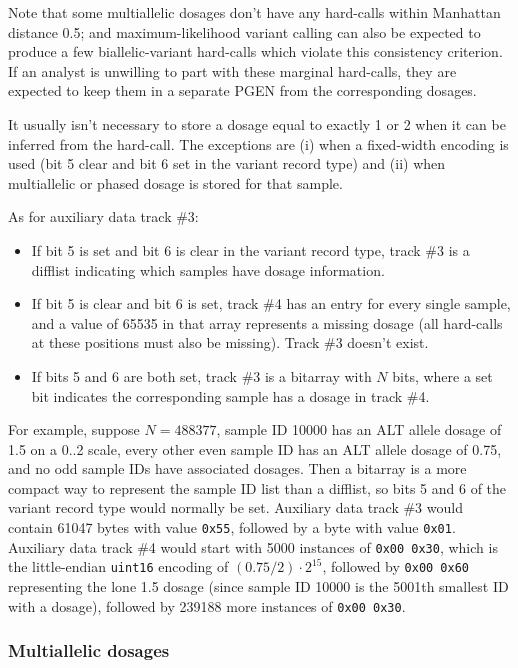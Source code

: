\documentclass[8pt]{article}
\begin{document}
Note that some multiallelic dosages don't have any hard-calls within Manhattan
distance 0.5; and maximum-likelihood variant calling can also be expected to
produce a few biallelic-variant hard-calls which violate this consistency
criterion.  If an analyst is unwilling to part with these marginal hard-calls,
they are expected to keep them in a separate PGEN from the corresponding
dosages.

It usually isn't necessary to store a dosage equal to exactly 1 or 2 when it
can be inferred from the hard-call.  The exceptions are (i) when a fixed-width
encoding is used (bit 5 clear and bit 6 set in the variant record type) and
(ii) when multiallelic or phased dosage is stored for that sample.

As for auxiliary data track \#3:

\begin{itemize}
\item If bit 5 is set and bit 6 is clear in the variant record type, track \#3
  is a difflist indicating which samples have dosage information.
\item If bit 5 is clear and bit 6 is set, track \#4 has an entry for every
  single sample, and a value of 65535 in that array represents a missing
  dosage (all hard-calls at these positions must also be missing).  Track \#3
  doesn't exist.
\item If bits 5 and 6 are both set, track \#3 is a bitarray with $N$ bits,
  where a set bit indicates the corresponding sample has a dosage in track \#4.
\end{itemize}

For example, suppose $N=488377$, sample ID 10000 has an ALT allele dosage of
1.5 on a 0..2 scale, every other even sample ID has an ALT allele dosage of
0.75, and no odd sample IDs have associated dosages.  Then a bitarray is a more
compact way to represent the sample ID list than a difflist, so bits 5 and 6 of
the variant record type would normally be set.  Auxiliary data track \#3 would
contain 61047 bytes with value \texttt{0x55}, followed by a byte with value
\texttt{0x01}.  Auxiliary data track \#4 would start with 5000 instances of
\texttt{0x00 0x30}, which is the little-endian \texttt{uint16} encoding of
$(0.75/2)\cdot 2^{15}$, followed by \texttt{0x00 0x60} representing the lone
1.5 dosage (since sample ID 10000 is the 5001th smallest ID with a dosage),
followed by 239188 more instances of \texttt{0x00 0x30}.

\subsubsection{Multiallelic dosages}
\end{document}
